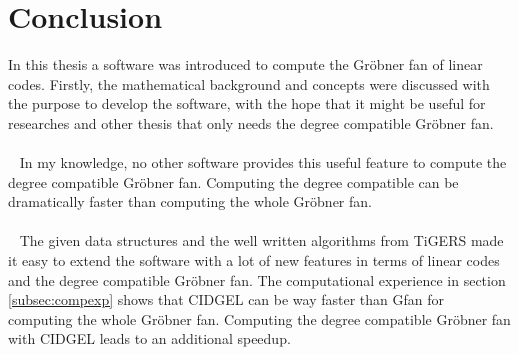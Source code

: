 \section{Conclusion}
\label{sec:concl}

In this thesis a software was introduced to compute the Gröbner fan of linear codes. Firstly, the mathematical background and concepts were discussed with the purpose to develop the software, with the hope that it might be useful for researches and other thesis that only needs the degree compatible Gröbner fan.\\
\\~
In my knowledge, no other software provides this useful feature to compute the degree compatible Gröbner fan. Computing the degree compatible can be dramatically faster than computing the whole Gröbner fan.\\
\\~
The given data structures and the well written algorithms from TiGERS \cite{tigers} made it easy to extend the software with a lot of new features in terms of linear codes and the degree compatible Gröbner fan. The computational experience in section \ref{subsec:compexp} shows that CIDGEL can be way faster than Gfan for computing the whole Gröbner fan. Computing the degree compatible Gröbner fan with CIDGEL leads to an additional speedup.